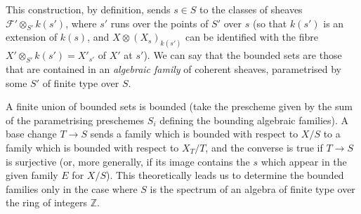 \documentclass{article}
\theoremstyle{definition}
\theoremstyle{definition}
\theoremstyle{definition}
\theoremstyle{definition}
\theoremstyle{remark}
\begin{document}
This construction, by definition, sends \(s\in S\) to the classes of sheaves \({\mathscr{F}}'\otimes_{S'}k(s')\), where \(s'\) runs over the points of \(S'\) over \(s\) (so that \(k(s')\) is an extension of \(k(s)\), and \(X\otimes (X_s)_{k(s')}\) can be identified with the fibre \(X'\otimes_{S'}k(s')=X'_{s'}\) of \(X'\) at \(s'\)).
We can say that the bounded sets are those that are contained in an \emph{algebraic family} of coherent sheaves, parametrised by some \(S'\) of finite type over \(S\).

A finite union of bounded sets is bounded (take the prescheme given by the sum of the parametrising preschemes \(S_i\) defining the bounding algebraic families).
A base change \(T\to S\) sends a family which is bounded with respect to \(X/S\) to a family which is bounded with respect to \(X_T/T\), and the converse is true if \(T\to S\) is surjective (or, more generally, if its image contains the \(s\) which appear in the given family \(E\) for \(X/S\)).
This theoretically leads us to determine the bounded families only in the case where \(S\) is the spectrum of an algebra of finite type over the ring of integers \(\mathbb{Z}\).
\end{document}
